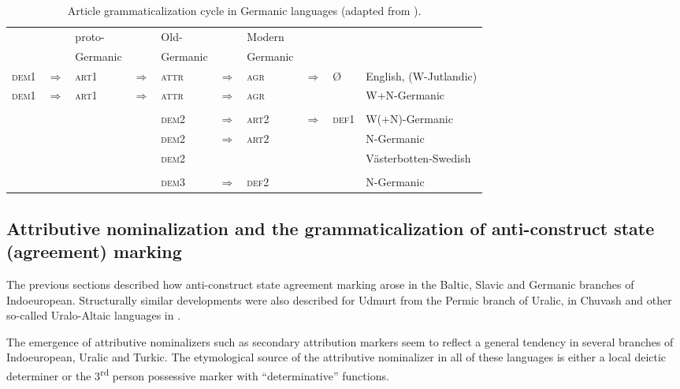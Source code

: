 {\begin{landscape}
\begin{table}
\begin{center}
\begin{footnotesize}
\begin{tabular}[t]{l l l l l l l l l l}
\hline
\hline
&	&proto-& &Old-&	&Modern&&\\
&	&Germanic&	&Germanic&	&Germanic&&\\
\hline							
\textsc{dem1}&$\Rightarrow$&\textsc{art1}&$\Rightarrow$&\textsc{attr}&$\Rightarrow$&\textsc{agr}&$\Rightarrow$&Ø&English, (W-Jutlandic)\\
\textsc{dem1}&$\Rightarrow$&\textsc{art1}&$\Rightarrow$&\textsc{attr}&$\Rightarrow$&\textsc{agr}&&&W+N-Germanic\\
\\
&&&		&\textsc{dem2}&$\Rightarrow$&\textsc{art2}&$\Rightarrow$&\textsc{def1}&W(+N)-Germanic\\
&&&		&\textsc{dem2}&$\Rightarrow$&\textsc{art2}&&&N-Germanic\\
&&&		&\textsc{dem2}&&&&&Västerbotten-Swedish\\
\\
&&&		&\textsc{dem3}&$\Rightarrow$&\textsc{def2}&&&N-Germanic\\
\hline
\hline
\end{tabular}
\end{footnotesize}
\end{center}
\caption[Article grammaticalization cycle in Germanic]{Article grammaticalization cycle in Germanic languages (adapted from \citealt[272]{riesler2006a}).}
\end{table}
\end{landscape}

\subsection[Attributive nominalization and anti-construct state]{Attributive nominalization and the grammaticalization of anti-construct state (agreement) marking}
The previous sections described how anti-construct state agreement marking arose in the Baltic, Slavic and Germanic branches of Indoeuropean. Structurally similar developments were also described for Udmurt from the Permic branch of Uralic, in Chuvash and other so-called Uralo-Altaic languages in . 

The emergence of attributive nominalizers such as secondary attribution markers seem to reflect a general tendency in several branches of Indoeuropean, Uralic and Turkic. The etymological source of the attributive nominalizer in all of these languages is either a local deictic determiner or the 3\textsuperscript{rd} person possessive marker with “determinative” functions.

}
